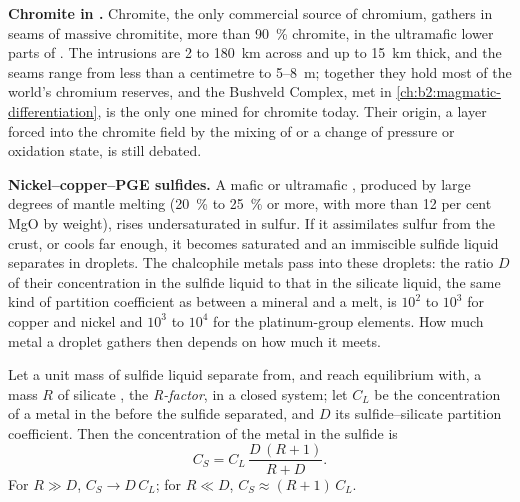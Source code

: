\textbf{Chromite in .} Chromite, the only commercial source of chromium,
gathers in seams of massive chromitite, more than \qty{90}{\percent} chromite, in the ultramafic
lower parts of . The intrusions are 2 to \qty{180}{km} across and up to
\qty{15}{km} thick, and the seams range from less than a centimetre to 5--\qty{8}{m}; together
they hold most of the world's chromium reserves, and the Bushveld Complex, met in
\cref{ch:b2:magmatic-differentiation}, is the only one mined for chromite today. Their origin, a
 layer forced into the chromite field by the mixing of  or a change of pressure or
oxidation state, is still debated.

\textbf{Nickel--copper--PGE sulfides.} A mafic or ultramafic , produced by large degrees of
mantle melting (\qty{20}{\percent} to \qty{25}{\percent} or more, with more than 12 per cent MgO by
weight), rises undersaturated in sulfur. If it assimilates sulfur from the crust, or cools far
enough, it becomes saturated and an immiscible sulfide liquid separates in droplets. The
chalcophile metals pass into these droplets: the ratio $D$ of their concentration in the sulfide
liquid to that in the silicate liquid, the same kind of partition coefficient as between a
mineral and a melt, is $10^2$ to $10^3$ for copper and nickel and $10^3$ to $10^4$ for the
platinum-group elements. How much metal a droplet gathers then depends on how much  it meets.

\begin{proposition}[R-factor]\label{prop:b2:ore-deposits:r-factor}
Let a unit mass of sulfide liquid separate from, and reach equilibrium with, a mass $R$ of silicate
, the \emph{R-factor}, in a closed system; let $C_L$ be the concentration of a
metal in the  before the sulfide separated, and $D$ its sulfide--silicate partition
coefficient. Then the concentration of the metal in the sulfide is
\begin{equation}
C_S = C_L\,\frac{D\,(R + 1)}{R + D} .
\label{eq:b2:ore-deposits:r-factor}
\end{equation}
For $R \gg D$, $C_S \to D\,C_L$; for $R \ll D$, $C_S \approx (R + 1)\,C_L$.
\end{proposition}

